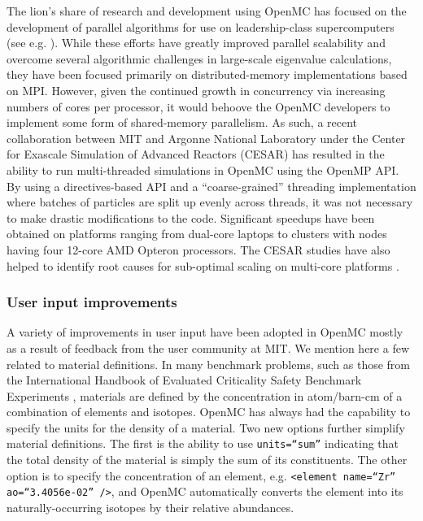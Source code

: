 \documentclass{ansconf}
\begin{document}
The lion's share of research and development using OpenMC has focused on the
development of parallel algorithms for use on leadership-class supercomputers
(see e.g. \cite{nse-romano-2012, ane-romano-2012, trans-romano-2012}). While
these efforts have greatly improved parallel scalability and overcome several
algorithmic challenges in large-scale eigenvalue calculations, they have been
focused primarily on distributed-memory implementations based on MPI. However,
given the continued growth in concurrency via increasing numbers of cores per
processor, it would behoove the OpenMC developers to implement some form of
shared-memory parallelism. As such, a recent collaboration between MIT and
Argonne National Laboratory under the Center for Exascale Simulation of Advanced
Reactors (CESAR) has resulted in the ability to run multi-threaded simulations
in OpenMC using the OpenMP API. By using a directives-based API and a
``coarse-grained'' threading implementation where batches of particles are split
up evenly across threads, it was not necessary to make drastic modifications to
the code. Significant speedups have been obtained on platforms ranging from
dual-core laptops to clusters with nodes having four 12-core AMD Opteron
processors. The CESAR studies have also helped to identify root causes for
sub-optimal scaling on multi-core platforms \cite{ijhpca-siegel-2012}.

\subsubsection{User input improvements}

A variety of improvements in user input have been adopted in OpenMC mostly as a
result of feedback from the user community at MIT. We mention here a few related
to material definitions. In many benchmark problems, such as those from the
International Handbook of Evaluated Criticality Safety Benchmark Experiments
\cite{icsbep-2009}, materials are defined by the concentration in atom/barn-cm
of a combination of elements and isotopes. OpenMC has always had the capability
to specify the units for the density of a material. Two new options further
simplify material definitions. The first is the ability to use
\texttt{units=``sum''} indicating that the total density of the material is
simply the sum of its constituents. The other option is to specify the
concentration of an element, e.g. \texttt{<element name=``Zr'' ao=``3.4056e-02''
  />}, and OpenMC automatically converts the element into its
naturally-occurring isotopes by their relative abundances.
\end{document}
